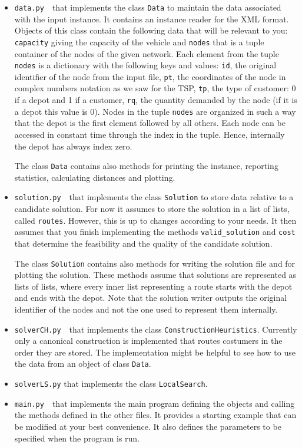 \begin{itemize}
\item \lstinline{data.py}\ \  that implements the class \lstinline{Data} to
  maintain the data associated with the input instance. It contains an
  instance reader for the XML format. Objects of this class contain the
  following data that will be relevant to you:
  \lstinline{capacity} giving the capacity of the vehicle and \lstinline{nodes}
that is a tuple container of the nodes of the given network. Each
element from the tuple \lstinline{nodes} is a dictionary with the
following keys and values: \verb!id!, the original identifier of the
node from the input file, \verb!pt!, the coordinates of the node in
complex numbers notation as we saw for the TSP, \verb!tp!, the type of
customer: 0 if a depot and 1 if a customer, \verb!rq!, the quantity
demanded by the node (if it is a depot this value is 0).
Nodes in the tuple \lstinline{nodes} are organized in such a way that
the depot is the first element followed by all others. Each node can be
accessed in constant time through the index in the tuple. Hence,
internally the depot has always index zero.     

The class \lstinline{Data} contains also methods for printing the
instance, reporting statistics, calculating distances and plotting.

\item \lstinline{solution.py}\ \  that implements the class \lstinline{Solution}
  to store data relative to a candidate solution. For now it assumes to
  store the solution in a list of lists, called
  \lstinline{routes}. However, this is up to changes according to your
  needs. It then assumes that you finish implementing the methods
  \lstinline{valid_solution} and \lstinline{cost} that determine the
  feasibility and the quality of the candidate solution.

The class \lstinline{Solution} contains also methods for writing the
solution file and for plotting the solution. These methods assume that
solutions are represented as lists of lists, where every inner list
representing a route starts with the depot and ends with the depot.
Note that the solution writer outputs the original identifier of the
nodes and not the one used to represent them internally.

\item \lstinline{solverCH.py}\ \  that implements the class
  \lstinline{ConstructionHeuristics}. Currently only a canonical
  construction is implemented that routes costumers in the order they
  are stored. The implementation might be helpful to see how to use the
  data from an object of class \lstinline{Data}.  
\item \lstinline{solverLS.py} that implements the class
  \lstinline{LocalSearch}.
\item \lstinline{main.py}\ \  that implements the main program defining the
  objects and calling the methods defined in the other files. It
  provides a starting example that can be modified at your best
  convenience. It also defines the parameters to be specified when the
  program is run. 
\end{itemize}


